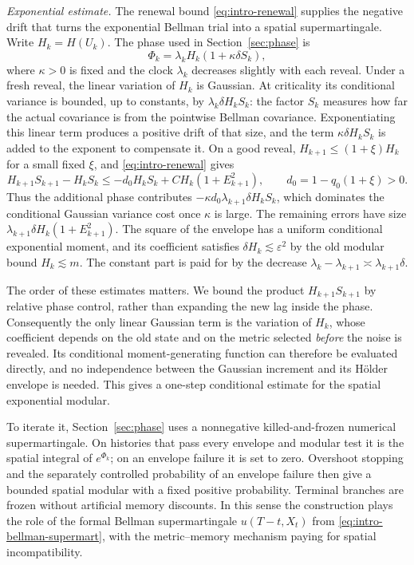 \documentclass[11pt]{article}
\theoremstyle{definition}
\theoremstyle{remark}
\numberwithin{equation}{section}
\begin{document}
\emph{Exponential estimate.}
The renewal bound \eqref{eq:intro-renewal} supplies the negative
drift that turns the exponential Bellman trial into a spatial
supermartingale. Write $H_k=H(U_k)$. The phase used in
Section~\ref{sec:phase} is
\label{not:lyapunovfirst}
\[
 \Phi_k=\lambda_k H_k(1+\kappa\delta S_k),
\]
where $\kappa>0$ is fixed and the clock $\lambda_k$ decreases
slightly with each reveal. Under a fresh reveal, the linear variation
of $H_k$ is Gaussian. At criticality its conditional variance is
bounded, up to constants, by $\lambda_k\delta H_kS_k$: the factor
$S_k$ measures how far the actual covariance is from the pointwise
Bellman covariance. Exponentiating this linear term produces a
positive drift of that size, and the term $\kappa\delta H_kS_k$ is
added to the exponent to compensate it. On a good reveal,
$H_{k+1}\le(1+\xi)H_k$ for a small fixed $\xi$, and
\eqref{eq:intro-renewal} gives
\[
 H_{k+1}S_{k+1}-H_kS_k
 \le -d_0 H_kS_k+C H_k(1+E_{k+1}^2),
 \qquad d_0=1-q_0(1+\xi)>0.
\]
Thus the additional phase contributes
$-\kappa d_0\lambda_{k+1}\delta H_kS_k$, which dominates the
conditional Gaussian variance cost once $\kappa$ is large. The
remaining errors have size $\lambda_{k+1}\delta H_k(1+E_{k+1}^2)$.
The square of the envelope has a uniform conditional exponential
moment, and its coefficient satisfies $\delta H_k\lesssim\varepsilon^2$
by the old modular bound $H_k\lesssim m$. The constant part is paid
for by the decrease $\lambda_k-\lambda_{k+1}\asymp\lambda_{k+1}\delta$.

The order of these estimates matters. We bound the product
$H_{k+1}S_{k+1}$ by relative phase control, rather than expanding the
new lag inside the phase. Consequently the only linear Gaussian term
is the variation of $H_k$, whose coefficient depends on the old state
and on the metric selected \emph{before} the noise is revealed. Its
conditional moment-generating function can therefore be evaluated
directly, and no independence between the Gaussian increment and its
H\"older envelope is needed. This gives a one-step conditional
estimate for the spatial exponential modular.

To iterate it, Section~\ref{sec:phase} uses a nonnegative
killed-and-frozen numerical supermartingale. On histories that pass
every envelope and modular test it is the spatial integral of
$e^{\Phi_k}$; on an envelope failure it is set to zero. Overshoot stopping
and the separately controlled probability of an envelope failure
then give a bounded spatial modular with a fixed positive
probability. Terminal branches are frozen without artificial memory
discounts. In this sense the construction plays the role of the
formal Bellman supermartingale $u(T-t,X_t)$ from
\eqref{eq:intro-bellman-supermart}, with the metric--memory mechanism
paying for spatial incompatibility.
\end{document}
